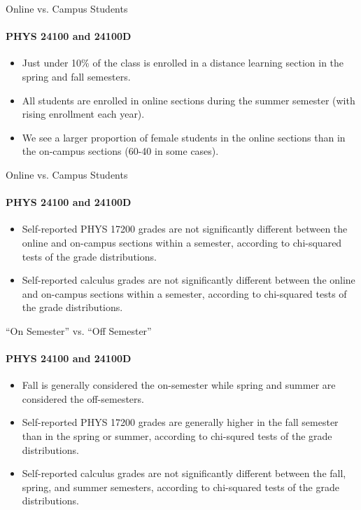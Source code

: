 \documentclass[xcolor=x11names,compress]{beamer}
\begin{document}
\begin{frame}{Online vs. Campus Students}
	\framesubtitle{PHYS 24100 and 24100D}
	\begin{itemize}
		\item Just under 10\% of the class is enrolled in a distance learning section in the spring and fall semesters.
		\vspace{4mm}
		\item All students are enrolled in online sections during the summer semester (with rising enrollment each year).
		\vspace{4mm}
		\item We see a larger proportion of female students in the online sections than in the on-campus sections (60-40 in some cases).
	\end{itemize}
\end{frame}

\begin{frame}{Online vs. Campus Students}
	\framesubtitle{PHYS 24100 and 24100D}
	\begin{itemize}
		\item Self-reported PHYS 17200 grades are not significantly different between the online and on-campus sections within a semester, according to chi-squared tests of the grade distributions.
		\vspace{4mm}
		\item Self-reported calculus grades are not significantly different between the online and on-campus sections within a semester, according to chi-squared tests of the grade distributions.
	\end{itemize}
\end{frame}

\begin{frame}{``On Semester'' vs. ``Off Semester''}
	\framesubtitle{PHYS 24100 and 24100D}
	\begin{itemize}
		\item Fall is generally considered the on-semester while spring and summer are considered the off-semesters.
		\vspace{3mm}
		\item Self-reported PHYS 17200 grades are generally higher in the fall semester than in the spring or summer, according to chi-squred tests of the grade distributions.
		\vspace{3mm}
		\item Self-reported calculus grades are not significantly different between the fall, spring, and summer semesters, according to chi-squared tests of the grade distributions.
	\end{itemize}
\end{frame}
\end{document}
